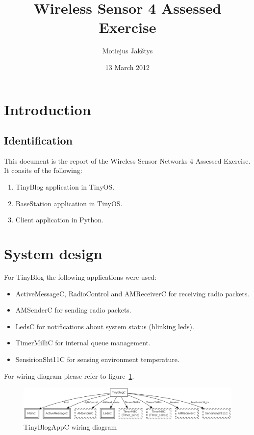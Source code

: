 \documentclass[english,11pt]{article}
\numberwithin{equation}{section}
\begin{document}
\title{Wireless Sensor 4 Assessed Exercise}
\author{Motiejus Jakštys}
\date{13 March 2012}

\maketitle
\pagebreak
\tableofcontents
\pagebreak

\section{Introduction}

\subsection{Identification}

This document is the report of the Wireless Sensor Networks 4 Assessed Exercise.
It consits of the following:

\begin{enumerate}
    \item TinyBlog application in TinyOS.
    \item BaseStation application in TinyOS.
    \item Client application in Python.
\end{enumerate}

\section{System design}

For TinyBlog the following applications were used:
\begin{itemize}
    \item ActiveMessageC, RadioControl and AMReceiverC for receiving radio
        packets.
    \item AMSenderC for sending radio packets.
    \item LedsC for notifications about system status (blinking leds).
    \item TimerMilliC for internal queue management.
    \item SensirionSht11C for sensing environment temperature.
\end{itemize}

For wiring diagram please refer to figure~\ref{fig:wiring_diagram}.

\begin{figure}
    \centering
    \includegraphics[width=\textwidth]{TinyBlogAppC.png}
    \caption{TinyBlogAppC wiring diagram}
    \label{fig:wiring_diagram}
\end{figure}
\end{document}
